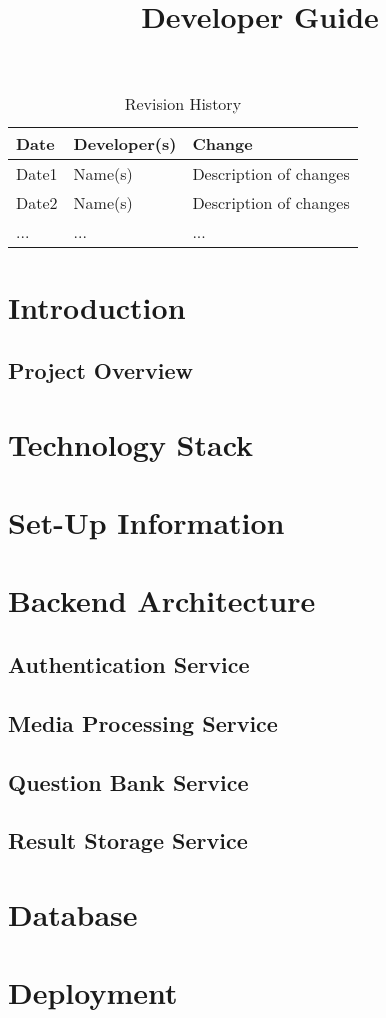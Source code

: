 \documentclass{article}
\title{Developer Guide\\\progname}
\author{\authname}
\date{}
\begin{document}
\maketitle
\newpage

\begin{table}[h!]
\caption{Revision History} \label{TblRevisionHistory}
\begin{tabularx}{\textwidth}{llX}
\toprule
\textbf{Date} & \textbf{Developer(s)} & \textbf{Change}\\
\midrule
Date1 & Name(s) & Description of changes\\
Date2 & Name(s) & Description of changes\\
... & ... & ...\\
\bottomrule
\end{tabularx}
\end{table}

\newpage


\tableofcontents

\section{Introduction}
\subsection{Project Overview}

\section{Technology Stack}
\section{Set-Up Information}
\section{Backend Architecture}


\subsection{Authentication Service}
\subsection{Media Processing Service}
\subsection{Question Bank Service}
\subsection{Result Storage Service}

\section{Database}

\section{Deployment}
\end{document}
